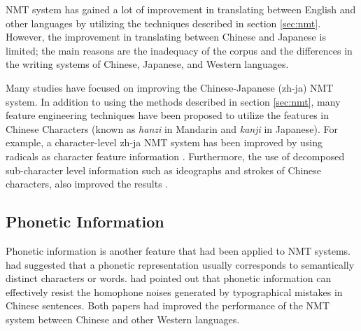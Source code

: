 NMT system has gained a lot of improvement in translating between English and other languages by utilizing the techniques described in section \ref{sec:nmt}. However, the improvement in translating between Chinese and Japanese is limited; the main reasons are the inadequacy of the corpus and the differences in the writing systems of Chinese, Japanese, and Western languages.

Many studies have focused on improving the Chinese-Japanese (zh-ja) NMT system. In addition to using the methods \cite{imamura2018enhancement, chu2017empirical, zhang2020parallel} described in section \ref{sec:nmt}, many feature engineering techniques have been proposed to utilize the features in Chinese Characters (known as \textit{hanzi} in Mandarin and \textit{kanji} in Japanese). For example, a character-level zh-ja NMT system has been improved by using radicals as character feature information \cite{8300572}. Furthermore, the use of decomposed sub-character level information such as ideographs and strokes of Chinese characters, also improved the results \cite{zhang-komachi-2018-neural}.

\subsection{Phonetic Information} \label{sec:phonetic}

Phonetic information is another feature that had been applied to NMT systems. \cite{khan2019diversity} had suggested that a phonetic representation usually corresponds to semantically distinct characters or words. \cite{liu-etal-2019-robust} had pointed out that phonetic information can effectively resist the homophone noises generated by typographical mistakes in Chinese sentences. Both papers had improved the performance of the NMT system between Chinese and other Western languages.


